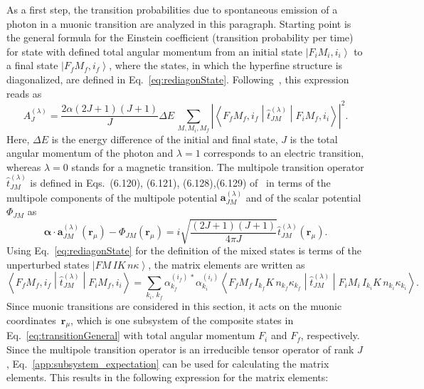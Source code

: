 As a first step, the transition probabilities due to spontaneous emission of a photon in a muonic transition are analyzed in this paragraph. Starting point is the general formula for the Einstein coefficient (transition probability per time) for state with defined total angular momentum from an initial state $\left|F_iM_i,i_i\right>$ to a final state $\left|F_fM_f,i_f\right>$, where the states, in which the hyperfine structure is diagonalized, are defined in Eq.~\eqref{eq:rediagonState}. Following~\cite[Section 6.]{johnson2007}, this expression reads as
\begin{equation}
\label{eq:transitionGeneral}
A^{(\lambda)}_{J}=\frac{2\alpha (2J+1)(J+1)}{J}\Delta E\,\sum_{M,M_i,M_f} \left|\left<F_fM_f,i_f\middle|\hat{t}^{(\lambda)}_{JM}\middle|F_iM_f,i_i\right>\right|^2.
\end{equation}
Here, $\Delta E$ is the energy difference of the initial and final state, $J$ is the total angular momentum of the photon and $\lambda=1$ corresponds to an electric transition, whereas $\lambda=0$ stands for a magnetic transition. The multipole transition operator $\hat{t}^{(\lambda)}_{JM}$ is defined in Eqs.~(6.120), (6.121), (6.128),(6.129) of~\cite{johnson2007} in terms of the multipole components of the multipole potential $\mathbf{a}^{(\lambda)}_{JM}$ and of the scalar potential $\Phi_{JM}$ as
\begin{equation}
\boldsymbol{\alpha}\cdot \mathbf{a}^{(\lambda)}_{JM}(\mathbf{r}_\mu) - \Phi_{JM}(\mathbf{r}_\mu) = i\sqrt{\frac{(2J+1)(J+1)}{4\pi J}}\hat{t}^{(\lambda)}_{JM}(\mathbf{r}_\mu).
\end{equation}
Using Eq.~\eqref{eq:rediagonState} for the definition of the mixed states is terms of the unperturbed states $\left| FM\,IK\,n\kappa\right>$, the matrix elements are written as
\begin{equation}
\label{eq:tranElement1}
\left<F_fM_f,i_f\middle|\hat{t}^{(\lambda)}_{JM}\middle|F_iM_f,i_i\right> =
\sum_{k_i,\,k_f}\alpha^{(i_f)\,*}_{k_f} \alpha^{(i_i)}_{k_i}\left<F_fM_f\,I_{k_f}K\,n_{k_f}\kappa_{k_f} \middle|\hat{t}^{(\lambda)}_{JM}\middle|F_iM_i\,I_{k_i}K\,n_{k_i}\kappa_{k_i}\right>.
\end{equation}
Since muonic transitions are considered in this section, it acts on the muonic coordinates~$\mathbf{r}_\mu$, which is one subsystem of the composite states in Eq.~\eqref{eq:transitionGeneral} with total angular momentum $F_i$ and $F_f$, respectively. Since the multipole transition operator is an irreducible tensor operator of rank $J$, Eq.~\eqref{app:subsystem_expectation} can be used for calculating the matrix elements. This results in the following expression for the matrix elements:
